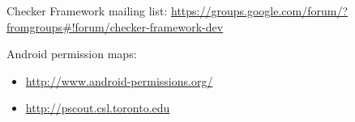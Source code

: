 Checker Framework mailing list: \url{https://groups.google.com/forum/?fromgroups#!forum/checker-framework-dev}

Android permission maps:
\begin{itemize}
\item \url{http://www.android-permissions.org/}
\item \url{http://pscout.csl.toronto.edu}
\end{itemize}


